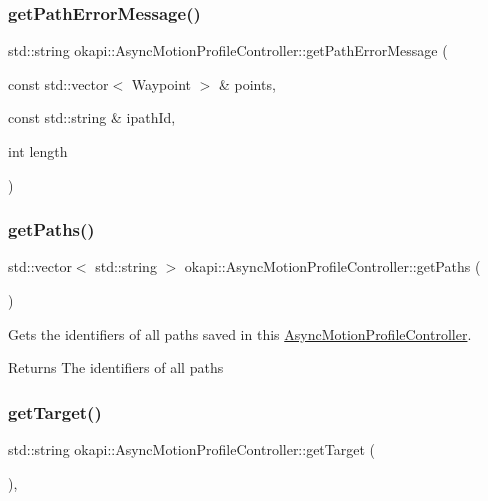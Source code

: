\subsubsection{\texorpdfstring{getPathErrorMessage()}{getPathErrorMessage()}}
{\footnotesize\ttfamily std\+::string okapi\+::\+Async\+Motion\+Profile\+Controller\+::get\+Path\+Error\+Message (\begin{DoxyParamCaption}\item[{const std\+::vector$<$ Waypoint $>$ \&}]{points,  }\item[{const std\+::string \&}]{ipath\+Id,  }\item[{int}]{length }\end{DoxyParamCaption})\hspace{0.3cm}{\ttfamily [protected]}}

\mbox{\label{classokapi_1_1AsyncMotionProfileController_a5853ae5af552cf56f36c9563733c6ace}} 
\subsubsection{\texorpdfstring{getPaths()}{getPaths()}}
{\footnotesize\ttfamily std\+::vector$<$ std\+::string $>$ okapi\+::\+Async\+Motion\+Profile\+Controller\+::get\+Paths (\begin{DoxyParamCaption}{ }\end{DoxyParamCaption})}

Gets the identifiers of all paths saved in this \mbox{\hyperlink{classokapi_1_1AsyncMotionProfileController}{Async\+Motion\+Profile\+Controller}}.

\begin{DoxyReturn}{Returns}
The identifiers of all paths 
\end{DoxyReturn}
\mbox{\label{classokapi_1_1AsyncMotionProfileController_a9f9e44e987481619cbec37d5e35c71e8}} 
\subsubsection{\texorpdfstring{getTarget()}{getTarget()}}
{\footnotesize\ttfamily std\+::string okapi\+::\+Async\+Motion\+Profile\+Controller\+::get\+Target (\begin{DoxyParamCaption}{ }\end{DoxyParamCaption})\hspace{0.3cm}{\ttfamily [override]}, {\ttfamily [virtual]}}

